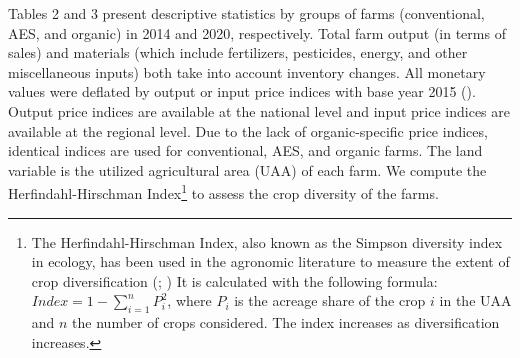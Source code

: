 \begin{Article}
\begin{refsection}[Lassalas]
Tables 2 and 3 present descriptive statistics by groups of farms
(conventional, AES, and organic) in 2014 and 2020, respectively. Total
farm output (in terms of sales) and materials (which include
fertilizers, pesticides, energy, and other miscellaneous inputs) both
take into account inventory changes. All monetary values were deflated
by output or input price indices with base year 2015 (\textcite{insee_2022}).
Output price indices are available at the national level and input price
indices are available at the regional level. Due to the lack of
organic-specific price indices, identical indices are used for
conventional, AES, and organic farms. The land variable is the utilized
agricultural area (UAA) of each farm. We compute the
Herfindahl-Hirschman Index\footnote{The Herfindahl-Hirschman Index, also
  known as the Simpson diversity index in ecology, has been used in the
  agronomic literature to measure the extent of crop diversification
  (\textcite{basavaraj2016crop}; \textcite{adjimoti2018}) It is calculated
  with the following formula:
  \(Index = 1 - \sum_{i = 1}^{n}P_{i}^{2}\), where \(P_{i}\) is the
  acreage share of the crop \(i\) in the UAA and \(n\) the number of
  crops considered. The index increases as diversification increases.}
to assess the crop diversity of the farms.



\begin{table}[!h]
  \centering
  \tabcolsep=3pt
  \caption{Descriptive statistics -- 2014}
    \label{TableDesc2014}
\end{table}
\end{refsection}
\end{Article}
